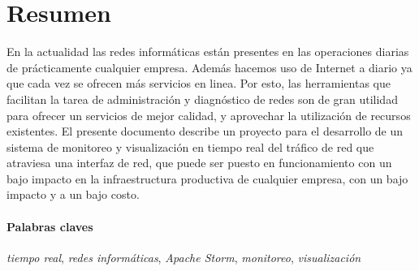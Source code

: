 \section*{Resumen}

En la actualidad las redes informáticas están presentes en las operaciones diarias de prácticamente cualquier empresa. Además hacemos uso de Internet a diario ya que cada vez se ofrecen más servicios en linea. Por esto, las herramientas que facilitan la tarea de administración y diagnóstico de redes son de gran utilidad para ofrecer un servicios de mejor calidad, y aprovechar la utilización de recursos existentes.
El presente documento describe un proyecto para el desarrollo de un sistema de monitoreo y visualización en tiempo real del tráfico de red que atraviesa una interfaz de red, que puede ser puesto en funcionamiento con un bajo impacto en la infraestructura productiva de cualquier empresa, con un bajo impacto y a un bajo costo.

\paragraph{Palabras claves} \textit{tiempo real}, \textit{redes informáticas}, \textit{Apache Storm}, \textit{monitoreo}, \textit{visualización}

\newpage